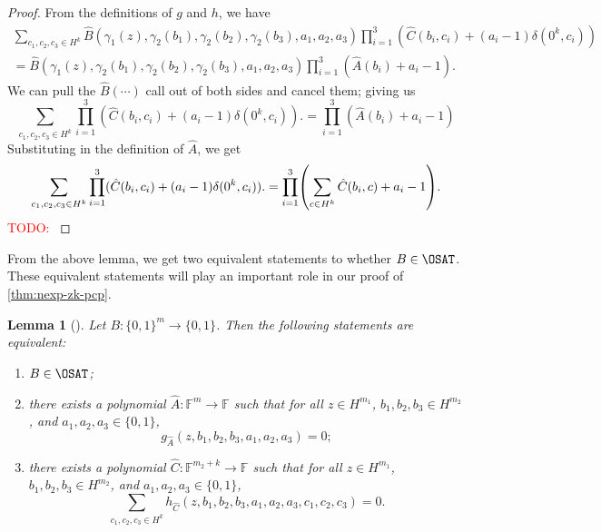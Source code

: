 \documentclass[english,12pt]{reedthesis}
\theoremstyle{plain}
\newtheorem{lemma}[lemma]{Lemma}
\theoremstyle{definition}
\theoremstyle{remark}
\newcommand{\TODO}[1]{\textcolor{red}{TODO: #1}}
\begin{document}
\begin{proof}
  From the definitions of $g$ and $h$, we have
  \begin{multline}\label{eqn:expand-gh-defs}
    \sum_{c_{1}, c_{2}, c_{3} \in H^{k}}\hat{B}(\gamma_{1}(z), \gamma_{2}(b_{1}), \gamma_{2}(b_{2}), \gamma_{2}(b_{3}), a_{1}, a_{2}, a_{3})
    \prod_{i=1}^{3}(\hat{C}(b_{i}, c_{i}) + (a_{i} - 1)\delta(0^{k}, c_{i})) \\
    = \hat{B}(\gamma_{1}(z), \gamma_{2}(b_{1}), \gamma_{2}(b_{2}), \gamma_{2}(b_{3}), a_{1}, a_{2}, a_{3})
    \prod_{i=1}^{3}(\hat{A}(b_{i}) + a_{i} - 1).
  \end{multline}
  We can pull the $\hat{B}(\cdots)$ call out of both sides and cancel them; giving us
  \begin{equation}\label{eqn:cancel-b-call}
    \sum_{c_{1}, c_{2}, c_{3} \in H^{k}}\prod_{i=1}^{3}(\hat{C}(b_{i}, c_{i}) + (a_{i} - 1)\delta(0^{k}, c_{i})).
    = \prod_{i=1}^{3}(\hat{A}(b_{i}) + a_{i} - 1)
  \end{equation}
  Substituting in the definition of $\hat{A}$, we get
  \begin{equation}\label{eqn:subst-a-def}
    \sum_{c_{1}, c_{2}, c_{3} \in H^{k}}\prod_{i=1}^{3}(\hat{C}(b_{i}, c_{i}) + (a_{i} - 1)\delta(0^{k}, c_{i})).
    = \prod_{i=1}^{3}\mleft(\sum_{c \in H^{k}}\hat{C}(b_{i}, c) + a_{i} - 1\mright).
  \end{equation}
  \TODO{}
\end{proof}

From the above lemma, we get two equivalent statements to whether $B \in \OSAT$.
These equivalent statements will play an important role in our proof of
\cref{thm:nexp-zk-pcp}.

\begin{lemma}[{\cite[Claim 6.5]{GOS25}}]\label{lem:three-equiv}
  Let $B\colon \{0, 1\}^{m} \rightarrow \{0, 1\}$. Then the following statements are
  equivalent:
  \begin{enumerate}
    \item\label{item:b-in-osat} $B \in \OSAT$;
    \item\label{item:exists-a} there exists a polynomial
          $\hat{A}\colon \mathbb{F}^{m} \rightarrow \mathbb{F}$ such that for all
          $z \in H^{m_{1}}$, $b_{1}, b_{2}, b_{3} \in H^{m_{2}}$, and
          $a_{1}, a_{2}, a_{3} \in \{0, 1\}$,
          \begin{equation}
            g_{\hat{A}}(z, b_{1}, b_{2}, b_{3}, a_{1}, a_{2}, a_{3}) = 0;
          \end{equation}
    \item\label{item:exists-c} there exists a polynomial
          $\hat{C}\colon \mathbb{F}^{m_{2}+k} \rightarrow \mathbb{F}$ such that for all
          $z \in H^{m_{1}}$, $b_{1}, b_{2}, b_{3} \in H^{m_{2}}$, and
          $a_{1}, a_{2}, a_{3} \in \{0, 1\}$,
          \begin{equation}
            \sum_{c_{1}, c_{2}, c_{3} \in H^{k}}h_{\hat{C}}(z, b_{1}, b_{2}, b_{3}, a_{1}, a_{2}, a_{3}, c_{1}, c_{2}, c_{3}) = 0.
          \end{equation}
  \end{enumerate}
\end{lemma}
\end{document}
